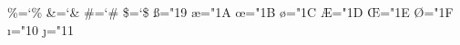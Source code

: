 \def\m@ketabbox{\begingroup
  \global\setbox\tabsyet\copy\tabs
  \global\setbox\tabsdone\null
  \def\cr{\@crtrue\crcr\egroup\egroup
    \ifus@\unvbox\z@\lastbox\fi\endgroup
    \setbox\tabs\hbox{\unhbox\tabsyet\unhbox\tabsdone}}%
  \setbox\z@\vbox\bgroup\@crfalse
    \ialign\bgroup&\t@bbox##\t@bb@x\crcr}

\def\t@bbox{\setbox\z@\hbox\bgroup}
\def\t@bb@x{\if@cr\egroup %
  \else\hss\egroup \global\setbox\tabsyet\hbox{\unhbox\tabsyet
      \global\setbox\@ne\lastbox}%
    \ifvoid\@ne\global\setbox\@ne\hbox to\wd\z@{}%
    \else\setbox\z@\hbox to\wd\@ne{\unhbox\z@}\fi
    \global\setbox\tabsdone\hbox{\box\@ne\unhbox\tabsdone}\fi
  \box\z@}

\def\hang{\hangindent\parindent}
\def\textindent#1{\indent\llap{#1\enspace}\ignorespaces}
\def\item{\par\hang\textindent}
\def\itemitem{\par\indent \hangindent2\parindent \textindent}
\def\narrower{\advance\leftskip\parindent
  \advance\rightskip\parindent}

\outer{}
\outer{}

\def\raggedright{\rightskip\z@ plus2em \spaceskip.3333em \xspaceskip.5em }
\def\ttraggedright{\tt\rightskip\z@ plus2em } %

\chardef\%=`\%
\chardef\&=`\&
\chardef\#=`\#
\chardef\$=`\$
\chardef\ss="19
\chardef\ae="1A
\chardef\oe="1B
\chardef\o="1C
\chardef\AE="1D
\chardef\OE="1E
\chardef\O="1F
\chardef\i="10 \chardef\j="11 %
\def\aa{\accent23a}
\def\l{\char32l}
\def\L{\leavevmode\setbox0\hbox{L}\hbox to\wd0{\hss\char32L}}

\def\leavevmode{\unhbox\voidb@x} %
\def\_{\leavevmode \kern.06em \vbox{\hrule width.3em}}
\def\AA{\leavevmode\setbox0\hbox{h}\dimen@\ht0\advance\dimen@-1ex%
  \rlap{\raise.67\dimen@\hbox{\char'27}}A}

\def\mathhexbox#1#2#3{\leavevmode
  \hbox{$\m@th \mathchar"#1#2#3$}}
\def\dag{\mathhexbox279}
\def\ddag{\mathhexbox27A}
\def\S{\mathhexbox278}
\def\P{\mathhexbox27B}

